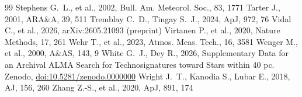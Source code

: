 \documentclass[twocolumn,twocolappendix,numberedappendix,appendixfloats]{openjournal}
\begin{document}
\begin{thebibliography}{99}
 Stephens G.~L., et al., 2002, Bull. Am. Meteorol. Soc., 83, 1771
 Tarter J., 2001, ARA\&A, 39, 511
 Tremblay C.~D., Tingay S.~J., 2024, ApJ, 972, 76
 Vidal C., et al., 2026, arXiv:2605.21093 (preprint)
 Virtanen P., et al., 2020, Nature Methods, 17, 261
 Wehr T., et al., 2023, Atmos. Meas. Tech., 16, 3581
 Wenger M., et al., 2000, A\&AS, 143, 9
 White G.~J., Dey R., 2026, Supplementary Data for an Archival ALMA Search for Technosignatures toward Stars within 40 pc. Zenodo, \href{https://doi.org/10.5281/zenodo.0000000}{doi:10.5281/zenodo.0000000}
 Wright J.~T., Kanodia S., Lubar E., 2018, AJ, 156, 260
 Zhang Z.-S., et al., 2020, ApJ, 891, 174
\end{thebibliography}
\end{document}
